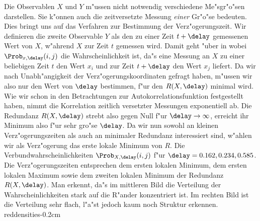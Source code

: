 Die Observablen $X$ und $Y$ m"ussen nicht notwendig verschiedene Me"sgr"o"sen darstellen.
Sie k"onnen auch die zeitversetzte Messung \emph{einer} Gr"o"se bedeuten.  Dies bringt uns
auf das Verfahren zur Bestimmung der Verz"ogerungszeit.  Wir definieren die zweite
Observable $Y$ als den zu einer Zeit $t+\delay$ gemessenen Wert von $X$, w"ahrend $X$ zur
Zeit $t$ gemessen wird. Damit geht  "uber in
wobei $\Prob_{x,\delay}(i,j)$ die Wahrscheinlichkeit ist, da"s
eine Messung an $X$ zu einer beliebigen Zeit $t$ den Wert $x_i$ und zur Zeit $t+\delay$
den Wert $x_j$ liefert.  Da wir nach
Unabh"angigkeit der Verz"ogerungskoordinaten gefragt haben, m"ussen wir also nur den Wert
von $\delay$ bestimmen, f"ur den $R(X,\delay)$ minimal wird. Wie wir schon in den
Betrachtungen zur Autokorrelationsfunktion festgestellt haben, nimmt die Korrelation
zeitlich versetzter Messungen exponentiell ab. Die Redundanz $R(X,\delay)$ strebt also
gegen Null f"ur $\delay\to\infty$, erreicht ihr Minimum also f"ur sehr gro"se $\delay$. Da
wir nun sowohl an kleinen Verz"ogerungszeiten als auch an minimaler Redundanz interessiert
sind, w"ahlen wir als Verz"ogerung das erste lokale Minimum von $R$.
 {Die
  Verbundwahrscheinlichkeiten $\Prob_{X,\delay}(i,j)$ f"ur $\delay=0.162,0.234,0.585$. Die
  Verz"ogerungszeiten entsprechen dem ersten lokalen Minimum, dem ersten lokalen Maximum
  sowie dem zweiten lokalen Minimum der Redundanz $R(X,\delay)$. Man erkennt, da"s im
  mittleren Bild die Verteilung der Wahrscheinlichkeiten stark auf die R"ander
  konzentriert ist. Im rechten Bild ist die Verteilung sehr flach, l"a"st jedoch kaum noch
  Struktur erkennen.  }{reddensities}{-0.2cm}

